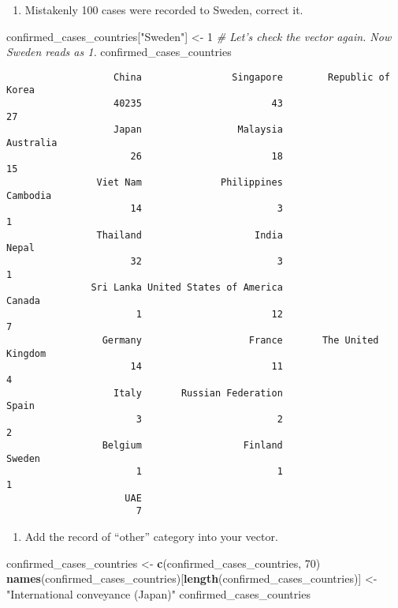 \documentclass[]{article}
\newenvironment{Shaded}{\begin{snugshade}}{\end{snugshade}}
\newcommand{\CommentTok}[1]{\textcolor[rgb]{0.56,0.35,0.01}{\textit{#1}}}
\newcommand{\DecValTok}[1]{\textcolor[rgb]{0.00,0.00,0.81}{#1}}
\newcommand{\KeywordTok}[1]{\textcolor[rgb]{0.13,0.29,0.53}{\textbf{#1}}}
\newcommand{\NormalTok}[1]{#1}
\newcommand{\StringTok}[1]{\textcolor[rgb]{0.31,0.60,0.02}{#1}}
\providecommand{\tightlist}{%
  \setlength{\itemsep}{0pt}\setlength{\parskip}{0pt}}
\begin{document}
\begin{enumerate}
\def\labelenumi{\roman{enumi})}
\setcounter{enumi}{2}
\tightlist
\item
  Mistakenly 100 cases were recorded to Sweden, correct it.
\end{enumerate}

\begin{Shaded}
\begin{Highlighting}[]
\NormalTok{confirmed_cases_countries[}\StringTok{"Sweden"}\NormalTok{] <-}\StringTok{ }\DecValTok{1}
\CommentTok{# Let's check the vector again. Now Sweden reads as 1.}
\NormalTok{confirmed_cases_countries}
\end{Highlighting}
\end{Shaded}

\begin{verbatim}
                   China                Singapore        Republic of Korea 
                   40235                       43                       27 
                   Japan                 Malaysia                Australia 
                      26                       18                       15 
                Viet Nam              Philippines                 Cambodia 
                      14                        3                        1 
                Thailand                    India                    Nepal 
                      32                        3                        1 
               Sri Lanka United States of America                   Canada 
                       1                       12                        7 
                 Germany                   France       The United Kingdom 
                      14                       11                        4 
                   Italy       Russian Federation                    Spain 
                       3                        2                        2 
                 Belgium                  Finland                   Sweden 
                       1                        1                        1 
                     UAE 
                       7 
\end{verbatim}

\begin{enumerate}
\def\labelenumi{\roman{enumi})}
\setcounter{enumi}{3}
\tightlist
\item
  Add the record of ``other'' category into your vector.
\end{enumerate}

\begin{Shaded}
\begin{Highlighting}[]
\NormalTok{confirmed_cases_countries <-}\StringTok{ }\KeywordTok{c}\NormalTok{(confirmed_cases_countries, }\DecValTok{70}\NormalTok{)}
\KeywordTok{names}\NormalTok{(confirmed_cases_countries)[}\KeywordTok{length}\NormalTok{(confirmed_cases_countries)] <-}
\StringTok{  "International conveyance (Japan)"}
\NormalTok{confirmed_cases_countries}
\end{Highlighting}
\end{Shaded}
\end{document}
